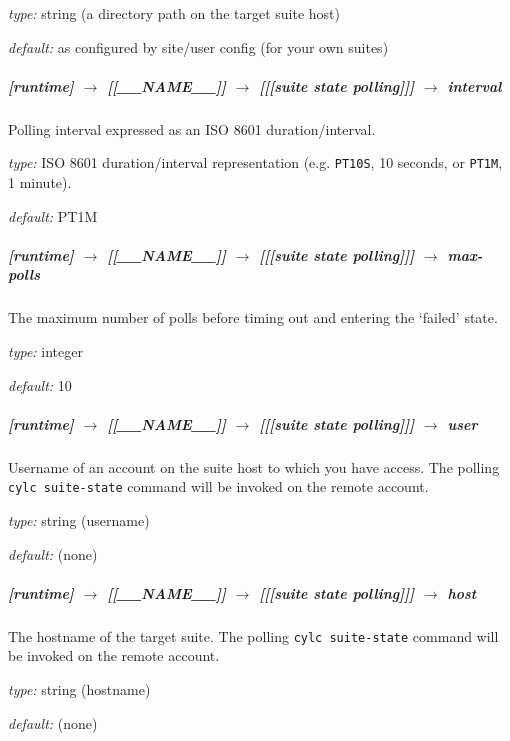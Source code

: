 \begin{myitemize}
    \item {\em type:} string (a directory path on the target suite host)
    \item {\em default:} as configured by site/user config (for your own suites)
\end{myitemize}

\subparagraph[interval]{[runtime] $\rightarrow$ [[\_\_NAME\_\_]] $\rightarrow$ [[[suite state polling]]] $\rightarrow$ interval}

Polling interval expressed as an ISO 8601 duration/interval.
\begin{myitemize}
    \item {\em type:} ISO 8601 duration/interval representation (e.g.
 \lstinline=PT10S=, 10 seconds, or \lstinline=PT1M=, 1 minute).
    \item {\em default:} PT1M
\end{myitemize}

\subparagraph[max-polls]{[runtime] $\rightarrow$ [[\_\_NAME\_\_]] $\rightarrow$ [[[suite state polling]]] $\rightarrow$ max-polls}

The maximum number of polls before timing out and entering the `failed' state.

\begin{myitemize}
    \item {\em type:} integer
    \item {\em default:} 10
\end{myitemize}

\subparagraph[user]{[runtime] $\rightarrow$ [[\_\_NAME\_\_]] $\rightarrow$ [[[suite state polling]]] $\rightarrow$ user}

Username of an account on the suite host to which you have access. The
polling \lstinline=cylc suite-state= command will be invoked
on the remote account.

\begin{myitemize}
    \item {\em type:} string (username)
    \item {\em default:} (none)
\end{myitemize}

\subparagraph[host]{[runtime] $\rightarrow$ [[\_\_NAME\_\_]] $\rightarrow$ [[[suite state polling]]] $\rightarrow$ host}

The hostname of the target suite. The polling \lstinline=cylc suite-state= command
will be invoked on the remote account.

\begin{myitemize}
    \item {\em type:} string (hostname)
    \item {\em default:} (none)
\end{myitemize}

